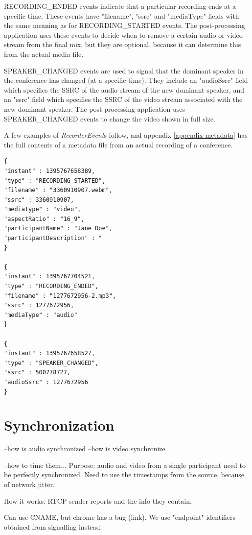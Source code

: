 \documentclass[twoside,openright,a4paper,12pt,english]{article}
\begin{document}
\smallskip
RECORDING\_ENDED events indicate that a particular recording ends at a specific
time. These events have "filename", "ssrc" and "mediaType" fields with the same meaning
as for RECORDING\_STARTED events. The post-processing application uses these
events to decide when to remove a certain audio or video stream from the final mix, but they
are optional, because it can determine this from the actual media file.

\smallskip
SPEAKER\_CHANGED events are used to signal that the dominant speaker in the
conference has changed (at a specific time). They include an "audioSsrc" field which specifies the
SSRC of the audio stream of the new dominant speaker, and an "ssrc" field which specifies the SSRC of the
video stream associated with the new dominant speaker. The post-processing application uses SPEAKER\_CHANGED
events to change the video shown in full size.

A few examples of \emph{RecorderEvent}s follow, and appendix
\ref{appendix-metadata} has the full contents of a metadata file from an
actual recording of a conference.

\begin{verbatim}
{
"instant" : 1395767658389,
"type" : "RECORDING_STARTED",
"filename" : "3360910907.webm",
"ssrc" : 3360910907,
"mediaType" : "video",
"aspectRatio" : "16_9",
"participantName" : "Jane Doe",
"participantDescription" : "
}

{
"instant" : 1395767704521,
"type" : "RECORDING_ENDED",
"filename" : "1277672956-2.mp3",
"ssrc" : 1277672956,
"mediaType" : "audio"
}

{
"instant" : 1395767658527,
"type" : "SPEAKER_CHANGED",
"ssrc" : 500778727,
"audioSsrc" : 1277672956
}
\end{verbatim}

\section{Synchronization}
\label{synchronization}
--how is audio synchronized
--how is video synchronize

--how to time them...
Purpose: audio and video from a single participant need to be perfectly synchronized. Need to use the timestamps from the source, because of network jitter. 

How it works: RTCP sender reports and the info they contain.

Can use CNAME, but chrome has a bug (link). We use "endpoint" identifiers obtained from signalling instead.
\end{document}

